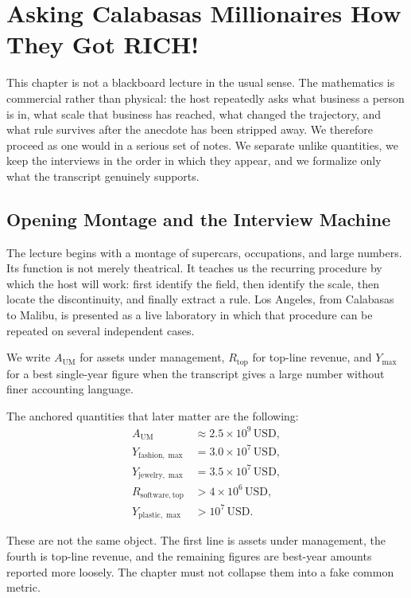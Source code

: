 \chapter{Asking Calabasas Millionaires How They Got RICH!}

This chapter is not a blackboard lecture in the usual sense. The mathematics is commercial rather than physical: the host repeatedly asks what business a person is in, what scale that business has reached, what changed the trajectory, and what rule survives after the anecdote has been stripped away. We therefore proceed as one would in a serious set of notes. We separate unlike quantities, we keep the interviews in the order in which they appear, and we formalize only what the transcript genuinely supports.

\section{Opening Montage and the Interview Machine}

The lecture begins with a montage of supercars, occupations, and large numbers. Its function is not merely theatrical. It teaches us the recurring procedure by which the host will work: first identify the field, then identify the scale, then locate the discontinuity, and finally extract a rule. Los Angeles, from Calabasas to Malibu, is presented as a live laboratory in which that procedure can be repeated on several independent cases.

\begin{definition}
We write \(A_{\mathrm{UM}}\) for assets under management, \(R_{\mathrm{top}}\) for top-line revenue, and \(Y_{\max}\) for a best single-year figure when the transcript gives a large number without finer accounting language.
\end{definition}

The anchored quantities that later matter are the following:
\begin{align}
A_{\mathrm{UM}} &\approx 2.5\times 10^9 \,\mathrm{USD},\\
Y_{\mathrm{fashion},\max} &= 3.0\times 10^7 \,\mathrm{USD},\\
Y_{\mathrm{jewelry},\max} &= 3.5\times 10^7 \,\mathrm{USD},\\
R_{\mathrm{software},\mathrm{top}} &> 4\times 10^6 \,\mathrm{USD},\\
Y_{\mathrm{plastic},\max} &> 10^7 \,\mathrm{USD}.
\end{align}

\begin{remark}
These are not the same object. The first line is assets under management, the fourth is top-line revenue, and the remaining figures are best-year amounts reported more loosely. The chapter must not collapse them into a fake common metric.
\end{remark}

